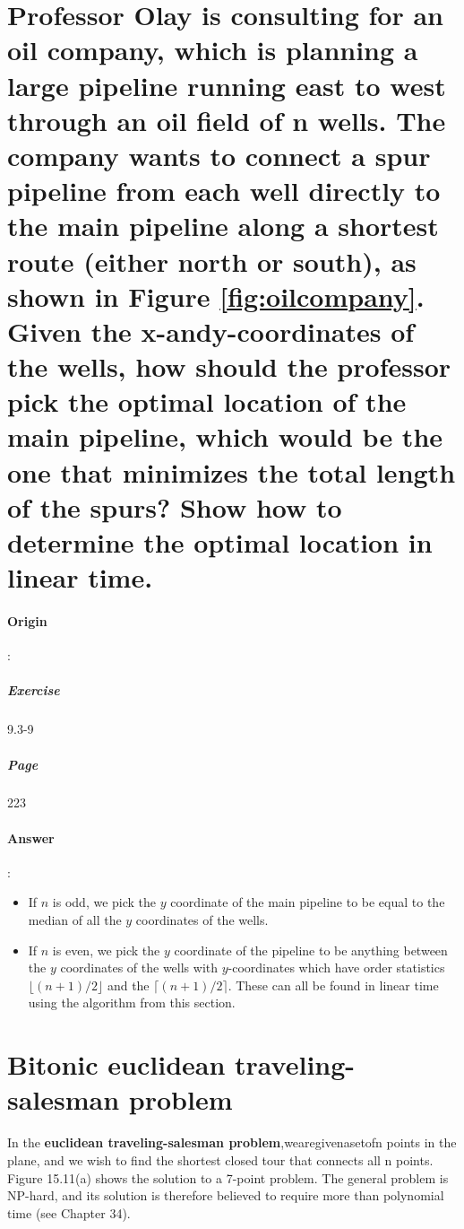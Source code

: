 \documentclass{article}
\begin{document}
\section{Professor Olay is consulting for an oil company, which is planning a large pipeline running east to west through an oil field of n wells. The company wants to connect a spur pipeline from each well directly to the main pipeline along a shortest route (either north or south), as shown in Figure \ref{fig:oilcompany}. Given the x-andy-coordinates of the wells, how should the professor pick the optimal location of the main pipeline, which would be the one that minimizes the total length of the spurs? Show how to determine the optimal location in linear time.}

\paragraph{Origin}:
  \subparagraph{Exercise}9.3-9
  \subparagraph{Page}223
\paragraph{Answer}:


\begin{itemize}
  \item If $n$ is odd, we pick the $y$ coordinate of the main pipeline to be equal to the median of all the $y$ coordinates of the wells.
  \item If $n$ is even, we pick the $y$ coordinate of the pipeline to be anything between the $y$ coordinates of the wells with $y$-coordinates which have order statistics $\lfloor (n + 1) / 2 \rfloor$ and the $\lceil (n + 1) / 2 \rceil$. These can all be found in linear time using the algorithm from this section.

\end{itemize}


\section{Bitonic euclidean traveling-salesman problem}

In the \textbf{euclidean traveling-salesman problem},wearegivenasetofn points in the plane, and we wish to find the shortest closed tour that connects all n points. Figure 15.11(a) shows the solution to a 7-point problem. The general problem is NP-hard, and its solution is therefore believed to require more than polynomial time (see Chapter 34).
\end{document}
